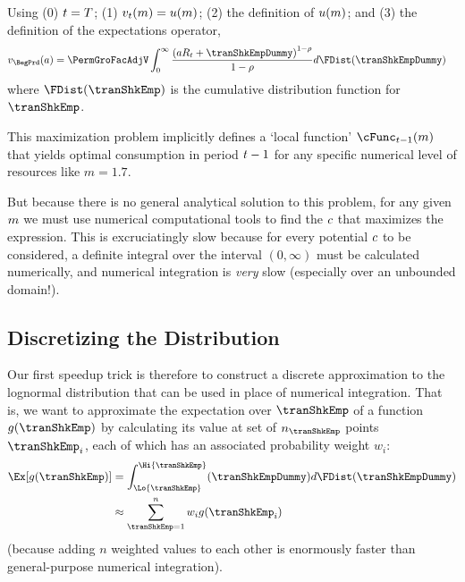 \documentclass[SolvingMicroDSOPs]{subfiles}
\begin{document}
Using (0) $t=T$; (1) $v_{t}(m)=u(m)$; (2) the definition of $u(m)$; and (3) the definition of the expectations operator,  %
\begin{equation}\begin{gathered}\begin{aligned}
      \vFunc_{\BegPrd}(\aNrm)   & = \PermGroFacAdjV\int_{0}^{\infty} \frac{\left(\aNrm \RNrm_{\prd}+ \tranShkEmpDummy\right)^{1-\CRRA}}{1-\CRRA}  d\FDist(\tranShkEmpDummy) \label{eq:NumDefInt}
    \end{aligned}\end{gathered}\end{equation}
where $\FDist(\tranShkEmp)$ is the cumulative distribution function for ${\tranShkEmp}$.

\lstset{basicstyle=\ttfamily\footnotesize,breaklines=true,language=Python,frame=single}


This maximization problem implicitly defines a `local function' $\cFunc_{\prdT-1}(\mNrm)$ that yields optimal consumption in period $t-1$ for any specific numerical level of resources like $m=1.7$.%

But because there is no general analytical solution to this problem, for any given $m$ we must use numerical computational tools to find the $c$ that maximizes the expression.  This is excruciatingly slow because for every potential $c$ to be considered, a definite integral over the interval $(0,\infty)$ must be calculated numerically, and numerical integration is \textit{very} slow (especially over an unbounded domain!).

\hypertarget{discretizing-the-distribution}{}
\subsection{Discretizing the Distribution}
Our first speedup trick is therefore to construct a discrete approximation to the lognormal distribution that can be used in place of numerical integration.  That is, we want to approximate the expectation over $\tranShkEmp$ of a function $g(\tranShkEmp)$ by calculating its value at set of $n_{\tranShkEmp}$ points $\tranShkEmp_{i}$, each of which has an associated probability weight $w_{i}$:
\begin{equation*}\begin{gathered}\begin{aligned}
      \Ex[g(\tranShkEmp)] & = \int_{\Lo{\tranShkEmp}}^{\Hi{\tranShkEmp}}(\tranShkEmpDummy)d\FDist(\tranShkEmpDummy) \\
      & \approx \sum_{\tranShkEmp = 1}^{n}w_{i}g(\tranShkEmp_{i})
    \end{aligned}\end{gathered}\end{equation*}
(because adding $n$ weighted values to each other is enormously faster than general-purpose numerical integration).
\end{document}
